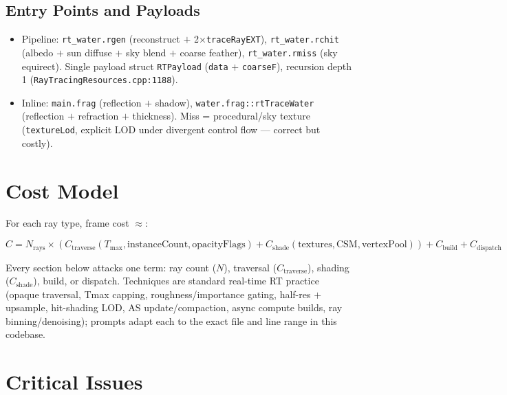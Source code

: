 \documentclass[11pt,a4paper]{article}
\begin{document}
\subsection{Entry Points and Payloads}

\begin{itemize}
    \item Pipeline: \texttt{rt\_water.rgen} (reconstruct $+$ 2$\times$\texttt{traceRayEXT}), \texttt{rt\_water.rchit} (albedo $+$ sun diffuse $+$ sky blend $+$ coarse feather), \texttt{rt\_water.rmiss} (sky equirect). Single payload struct \texttt{RTPayload} (\texttt{data} $+$ \texttt{coarseF}), recursion depth 1 (\texttt{RayTracingResources.cpp:1188}).
    \item Inline: \texttt{main.frag} (reflection $+$ shadow), \texttt{water.frag::rtTraceWater} (reflection $+$ refraction $+$ thickness). Miss = procedural/sky texture (\texttt{textureLod}, explicit LOD under divergent control flow --- correct but costly).
\end{itemize}

\section{Cost Model}

For each ray type, frame cost $\approx$:

\begin{equation}
C = N_{\mathrm{rays}} \times (C_{\mathrm{traverse}}(T_{\mathrm{max}}, \mathrm{instanceCount}, \mathrm{opacityFlags}) + C_{\mathrm{shade}}(\mathrm{textures}, \mathrm{CSM}, \mathrm{vertexPool})) + C_{\mathrm{build}} + C_{\mathrm{dispatch}}
\end{equation}

Every section below attacks one term: ray count ($N$), traversal ($C_{\mathrm{traverse}}$), shading ($C_{\mathrm{shade}}$), build, or dispatch. Techniques are standard real-time RT practice (opaque traversal, Tmax capping, roughness/importance gating, half-res $+$ upsample, hit-shading LOD, AS update/compaction, async compute builds, ray binning/denoising); prompts adapt each to the exact file and line range in this codebase.

\section{Critical Issues}
\end{document}
